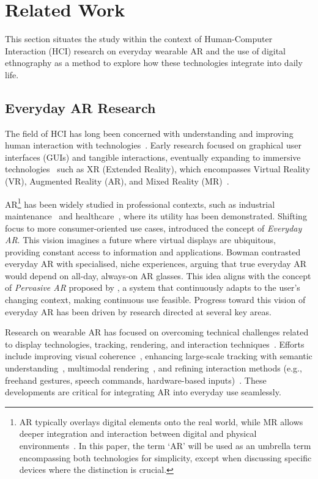 \section{Related Work}
\sloppy This section situates the study within the context of Human-Computer Interaction (HCI) research on everyday wearable AR and the use of digital ethnography as a method to explore how these technologies integrate into daily life.

\subsection{Everyday AR Research}

The field of HCI has long been concerned with understanding and improving human interaction with technologies~\cite{card2018psychology}. Early research focused on graphical user interfaces (GUIs) and tangible interactions, eventually expanding to immersive technologies~\cite{bowman20043d} such as XR (Extended Reality), which encompasses Virtual Reality (VR), Augmented Reality (AR), and Mixed Reality (MR)~\cite{milgram1994taxonomy}.

AR\footnote{AR typically overlays digital elements onto the real world, while MR allows deeper integration and interaction between digital and physical environments~\cite{milgram1994taxonomy}. In this paper, the term `AR' will be used as an umbrella term encompassing both technologies for simplicity, except when discussing specific devices where the distinction is crucial.} has been widely studied in professional contexts, such as industrial maintenance~\cite{burova2020utilizing, gattullo2020and, cao2020exploratory, henderson2010exploring} and healthcare~\cite{gasques2021artemis, eom2022neurolens, baashar2023towards}, where its utility has been demonstrated. Shifting focus to more consumer-oriented use cases, \citet{bowman2021keynote} introduced the concept of \textit{Everyday AR}. This vision imagines a future where virtual displays are ubiquitous, providing constant access to information and applications. Bowman contrasted everyday AR with specialised, niche experiences, arguing that true everyday AR would depend on all-day, always-on AR glasses. This idea aligns with the concept of \textit{Pervasive AR} proposed by \citet{grubert2016towards},
a system that continuously adapts to the user’s changing context, making continuous use feasible. Progress toward this vision of everyday AR has been driven by research directed at several key areas.

Research on wearable AR has focused on overcoming technical challenges related to display technologies, tracking, rendering, and interaction techniques~\cite{azuma2019road, billinghurst2021grand, tran2023wearable}. Efforts include improving visual coherence~\cite{bang2021lenslet, rathinavel2019varifocal, hamasaki2019varifocal}, enhancing large-scale tracking with semantic understanding~\cite{runz2018maskfusion, zhang2019hierarchical}, multimodal rendering~\cite{mandl2021neural, lopes2018adding}, and refining interaction methods (e.g., freehand gestures, speech commands, hardware-based inputs)~\cite{pei2022hand, schmitz2022squeezy, hirzle2019design}. These developments are critical for integrating AR into everyday use seamlessly.


